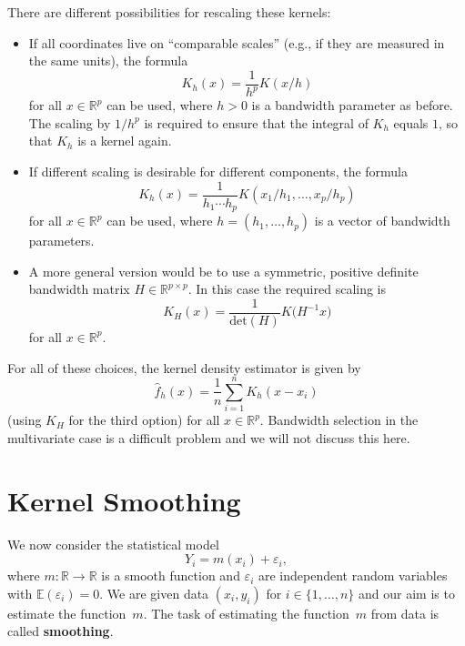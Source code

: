 \documentclass[
  a4paper,
]{article}
\theoremstyle{definition}
\theoremstyle{definition}
\theoremstyle{definition}
\theoremstyle{definition}
\theoremstyle{remark}
\begin{document}
There are different possibilities for rescaling these kernels:

\begin{itemize}
\item
  If all coordinates live on ``comparable scales'' (e.g., if they are
  measured in the same units), the formula
  \[ K_h(x) = \frac{1}{h^p} K(x/h) \]
  for all \(x\in\mathbb{R}^p\) can be used, where \(h>0\) is a bandwidth parameter
  as before. The scaling by \(1/h^p\) is required
  to ensure that the integral of \(K_h\) equals \(1\), so that \(K_h\) is
  a kernel again.
\item
  If different scaling is desirable for different components, the formula
  \begin{equation*}
    K_h(x)
    = \frac{1}{h_1 \cdots h_p} K(x_1/h_1, \ldots, x_p/h_p)
  \end{equation*}
  for all \(x\in\mathbb{R}^p\) can be used, where \(h = (h_1, \ldots, h_p)\) is a vector
  of bandwidth parameters.
\item
  A more general version would be to use a symmetric, positive definite
  bandwidth matrix \(H \in \mathbb{R}^{p\times p}\).
  In this case the required scaling is
  \begin{equation*}
    K_H(x)
    = \frac{1}{\mathrm{det}(H)} K\bigl( H^{-1} x \bigr)
  \end{equation*}
  for all \(x\in\mathbb{R}^p\).
\end{itemize}

For all of these choices, the kernel density estimator is given by
\begin{equation*}
  \hat f_h(x)
  = \frac{1}{n} \sum_{i=1}^n K_h(x - x_i)
\end{equation*}
(using \(K_H\) for the third option) for all \(x\in\mathbb{R}^p\).
Bandwidth selection in the multivariate case is a difficult problem
and we will not discuss this here.

\clearpage

\hypertarget{X05-smoothing}{%
\section{Kernel Smoothing}\label{X05-smoothing}}

We now consider the statistical model
\begin{equation*}
  Y_i
  = m(x_i) + \varepsilon_i,
\end{equation*}
where \(m\colon \mathbb{R}\to \mathbb{R}\) is a smooth function and \(\varepsilon_i\) are independent
random variables with \(\mathbb{E}(\varepsilon_i) = 0\). We are given data \((x_i, y_i)\) for
\(i\in \{1, \ldots, n\}\) and our aim is to estimate the function~\(m\). The
task of estimating the function~\(m\) from data is called \textbf{smoothing}.
\end{document}
